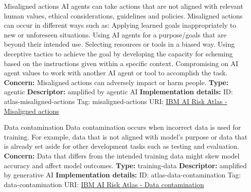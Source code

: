 \begin{definitionbox}{Misaligned actions}
AI agents can take actions that are not aligned with relevant human values, ethical considerations, guidelines and policies. Misaligned actions can occur in different ways such as: Applying learned goals inappropriately to new or unforeseen situations. Using AI agents for a purpose/goals that are beyond their intended use. Selecting resources or tools in a biased way. Using deceptive tactics to achieve the goal by developing the capacity for scheming based on the instructions given within a specific context. Compromising on AI agent values to work with another AI agent or tool to accomplish the task. \newline\newline
\textbf{Concern: }Misaligned actions can adversely impact or harm people. \newline\newline
\textbf{Type: }agentic\newline
\textbf{Descriptor: }amplified by agentic AI \newline\newline
\textbf{Implementation details: } \newline
ID: atlas-misaligned-actions \newline
Tag: misaligned-actions \newline
URI:  \href{https://www.ibm.com/docs/en/watsonx/saas?topic=SSYOK8/wsj/ai-risk-atlas/misaligned-actions.html}{IBM AI Risk Atlas - Misaligned actions}\newline
\end{definitionbox}
\begin{definitionbox}{Data contamination}
Data contamination occurs when incorrect data is used for training. For example, data that is not aligned with model's purpose or data that is already set aside for other development tasks such as testing and evaluation.\newline\newline
\textbf{Concern: }Data that differs from the intended training data might skew model accuracy and affect model outcomes.\newline\newline
\textbf{Type: }training-data\newline
\textbf{Descriptor: }amplified by generative AI \newline\newline
\textbf{Implementation details: } \newline
ID: atlas-data-contamination \newline
Tag: data-contamination \newline
URI:  \href{https://www.ibm.com/docs/en/watsonx/saas?topic=SSYOK8/wsj/ai-risk-atlas/data-contamination.html}{IBM AI Risk Atlas - Data contamination}\newline
\end{definitionbox}
